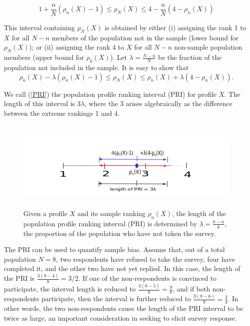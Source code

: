\documentclass[a4paper, 12pt]{article}
\begin{document}
\begin{equation}
1+\frac{n}{N}(\rho_n(X)-1)\le \rho_N(X)  \le 4-\frac{n}{N}(4-\rho_n(X))
\label{eq6}
\end{equation}

{\flushleft This} interval containing $\rho_N(X) $ is obtained by either (i) assigning the  rank 1 to $X$ for all $N-n$ members of the population not in the sample (lower bound for $\rho_N(X)$); or (ii) assigning the rank 4 to $X$  for all $N-n$ non-sample population members (upper bound for $\rho_k(X)$). Let  $\lambda=\frac{N-n}{N}$ be the fraction of the population not included in the sample.  It is easy to show that
\begin{equation}
\rho_n(X)-\lambda(\rho_n(X)-1)\le \rho_N(X) \le \rho_n(X) + \lambda(4-\rho_n(X)).
\label{PRI}
\end{equation}

{\flushleft We} call (\ref{PRI}) the population profile ranking interval (PRI) for profile $X$.  The length of this interval is 
  $3\lambda$, where the 3 arises algebraically as the difference between  the extreme rankings 1 and 4.

\begin{figure}[!htpb]
\centering
\includegraphics[width=6.5in, height=1.75in]{Confidence_Interval.png}
\caption{Given a profile $X$ and its sample ranking $\rho_n(X)$, the length of the population profile ranking interval (PRI) is determined by $\lambda=\frac{k-n}{k}$, the proportion of the population who have not taken the survey.}
\label{AL}
\end{figure}



The PRI can be used to quantify sample bias. Assume that, out of a total population $N=8$, two respondents have refused to take the survey, four have completed it, and the other two have not yet replied. In this case, the length of the PRI is  $\frac{3(8-4)}{8}=3/2$. If one of the non-respondents is convinced to participate, the interval length is reduced to $\frac{3(8-5)}{8}=\frac{9}{8}$, and if both non-respondents participate, then the interval is further reduced to $\frac{3(8-6)}{8}=\frac{3}{4}$. In other words, the two non-respondents  cause the length of the PRI interval to be twice as large, an important consideration in seeking to elicit survey response.
\end{document}
